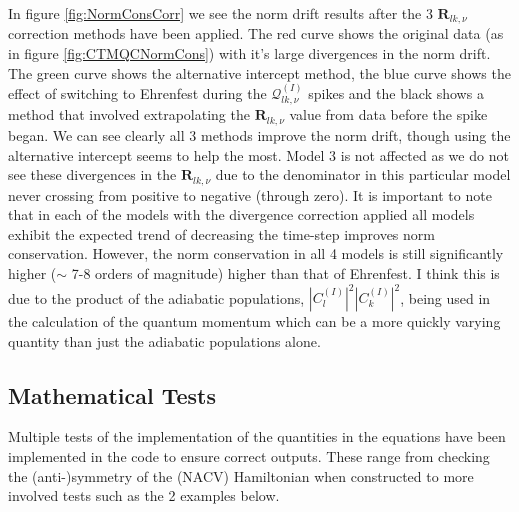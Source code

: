 In figure \ref{fig:NormConsCorr} we see the norm drift results after the 3 $\mathbf{R}_{lk, \nu}$ correction methods have been applied. The red curve shows the original data (as in figure \ref{fig:CTMQCNormCons}) with it's large divergences in the norm drift. The green curve shows the alternative intercept method, the blue curve shows the effect of switching to Ehrenfest during the $\mathcal{Q}_{lk, \nu}^{(I)}$ spikes and the black shows a method that involved extrapolating the $\mathbf{R}_{lk, \nu}$ value from data before the spike began. We can see clearly all 3 methods improve the norm drift, though using the alternative intercept seems to help the most. Model 3 is not affected as we do not see these divergences in the $\mathbf{R}_{lk, \nu}$ due to the denominator in this particular model never crossing from positive to negative (through zero). It is important to note that in each of the models with the divergence correction applied all models exhibit the expected trend of decreasing the time-step improves norm conservation. However, the norm conservation in all 4 models is still significantly higher ($\sim$ 7-8 orders of magnitude) higher than that of Ehrenfest. I think this is due to the product of the adiabatic populations, $|C_{l}^{(I)}|^2 |C_{k}^{(I)}|^2$, being used in the calculation of the quantum momentum which can be a more quickly varying quantity than just the adiabatic populations alone.

\subsection{Mathematical Tests}
Multiple tests of the implementation of the quantities in the equations have been implemented in the code to ensure correct outputs. These range from checking the (anti-)symmetry of the (NACV) Hamiltonian when constructed to more involved tests such as the 2 examples below.
